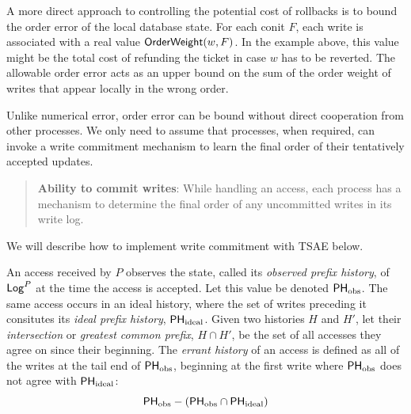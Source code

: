 \documentclass[]             %
{NASA}                       %
\theoremstyle{definition}
\begin{document}
A more direct approach to controlling the potential cost of rollbacks
is to bound the order error of the local database state. For each
conit $F$, each write is associated with a real value
$\mathsf{OrderWeight}{(w, F)}$. In the example above, this value might be the
total cost of refunding the ticket in case $w$ has to be reverted. The
allowable order error acts as an upper bound on the sum of the order
weight of writes that appear locally in the wrong order.

Unlike numerical error, order error can be bound without direct
cooperation from other processes. We only need to assume that
processes, when required, can invoke a write commitment mechanism to
learn the final order of their tentatively accepted updates.
\begin{quote}
  \textbf{Ability to commit writes}: While handling an access, each
  process has a mechanism to determine the final order of any
  uncommitted writes in its write log.
\end{quote}
We will describe how to implement write commitment with TSAE below.

An access received by $P$ observes the state, called its
\emph{observed prefix history}, of $\mathsf{Log}^{P}$ at the time the access is
accepted. Let this value be denoted $\mathsf{PH}_{\mathrm{obs}}$. The same access occurs
in an ideal history, where the set of writes preceding it consitutes
its \emph{ideal prefix history}, $\mathsf{PH}_{\mathrm{ideal}}$. Given two histories $H$
and $H'$, let their \emph{intersection} or \emph{greatest common
  prefix}, $H \cap H'$, be the set of all accesses they agree on since
their beginning. The \emph{errant history} of an access is defined as
all of the writes at the tail end of $\mathsf{PH}_{\mathrm{obs}}$, beginning at the first
write where $\mathsf{PH}_{\mathrm{obs}}$ does not agree with $\mathsf{PH}_{\mathrm{ideal}}$:
\begin{equation*}
 \mathsf{PH}_{\mathrm{obs}} - \left(\mathsf{PH}_{\mathrm{obs}} \cap
   \mathsf{PH}_{\mathrm{ideal}}\right)
\end{equation*}
\end{document}
